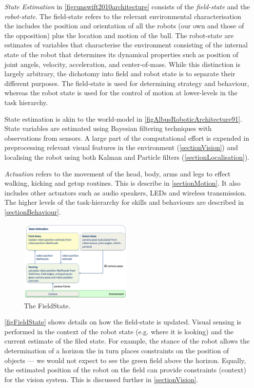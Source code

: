 \documentclass[pdftex,11pt,a4paper]{report}
\begin{document}
\emph{State Estimation} in \autoref{figrunswift2010architecture} consists of the \emph{field-state} and the \emph{robot-state}. The field-state refers to the relevant environmental characterisation the includes the position and orientation of all the robots (our own and those of the opposition) plus the location and motion of the ball. The robot-state are estimates of variables that characterise the environment consisting of the internal state of the robot that determines its dynamical properties such as position of joint angels, velocity, acceleration, and center-of-mass. While this distinction is largely arbitrary, the dichotomy into field and robot state is to separate their different purposes. The field-state is used for determining strategy and behaviour, whereas the robot state is used for the control of motion at lower-levels in the task hierarchy.

State estimation is akin to the world-model in \autoref{figAlbusRoboticArchitecture91}. State variables are estimated using Bayesian filtering techniques with observations from sensors. A large part of the computational effort is expended in preprocessing relevant visual features in the environment (\autoref{sectionVision}) and localising the robot using both Kalman and Particle filters (\autoref{sectionLocalisation}). 

\emph{Actuation} refers to the movement of the head, body, arms and legs to effect walking, kicking and getup routines. This is describe in \autoref{sectionMotion}. It  also includes other actuators such as audio speakers, LEDs and wireless transmission. The higher levels of the task-hierarchy for skills and behaviours are described in \autoref{sectionBehaviour}.

\begin{figure}[!htp]
\centering
\includegraphics[width=0.5\textwidth]{figures/FieldState}
\caption{The FieldState.} \label{figFieldState}
\end{figure}

\autoref{figFieldState} shows details on how the field-state is updated. Visual sensing is performed in the context of the robot state (e.g. where it is looking) and the current estimate of the filed state. For example, the stance of the robot allows the determination of a horizon the in turn places constraints on the position of objects --- we would not expect to see the green field above the horizon. Equally, the estimated position of the robot on the field can provide constraints (context) for the vision system. This is discussed further in \autoref{sectionVision}. 
\end{document}
